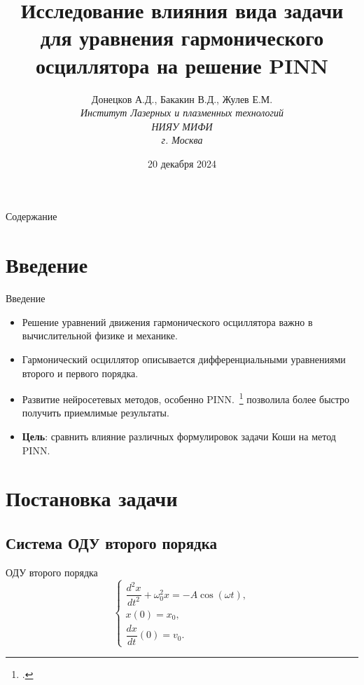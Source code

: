 \documentclass{beamer}
\title{Исследование влияния вида задачи для уравнения гармонического осциллятора на решение PINN}
\author{Донецков А.Д., Бакакин В.Д., Жулев Е.М.\\
\textit{
    Институт Лазерных и плазменных технологий\\
    НИЯУ МИФИ\\
    г. Москва
}}
\date{20 декабря 2024}
\begin{document}
\begin{frame}
    \titlepage
\end{frame}

\begin{frame}{Содержание}
    \tableofcontents
\end{frame}

\section{Введение}
\begin{frame}{Введение}
    \begin{itemize}
        \item Решение уравнений движения гармонического осциллятора важно в вычислительной физике и механике.
        \item Гармонический осциллятор описывается дифференциальными уравнениями второго и первого порядка.
        \item Развитие нейросетевых методов, особенно PINN.~\footcite{Lagaris1998,Raissi2019} позволила более быстро получить приемлимые результаты.
        \item \textbf{Цель}: сравнить влияние различных формулировок задачи Коши на метод PINN.
    \end{itemize}
\end{frame}

\section{Постановка задачи}
\subsection{Система ОДУ второго порядка}
\begin{frame}{ОДУ второго порядка}
    \begin{equation}
    \begin{cases}
    \dfrac{d^2x}{dt^2} + \omega_0^2 x = -A\cos(\omega t), \\
    x(0) = x_0, \\
    \dfrac{dx}{dt}(0) = v_0.
    \end{cases}
    \end{equation}
\end{frame}
\end{document}
